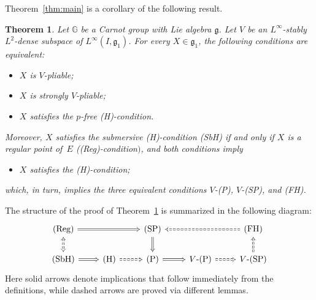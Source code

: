\documentclass[10pt,a4paper]{amsart}
\numberwithin{equation}{section}
\newtheorem{Theorem}{Theorem}[section]
\theoremstyle{definition}
\begin{document}
Theorem~\ref{thm:main} is a corollary of the following result.


\begin{Theorem}\label{thm:strong_main}
 Let $\mathbb{G}$ be a Carnot group with Lie algebra ${\mathfrak g}$. Let $V$ be an
 $L^\infty$-stably $L^2$-dense subspace of $L^\infty(I,{\mathfrak g}_1)$.
 For every $X\in {\mathfrak g}_1$, the following conditions are equivalent:
 \begin{itemize}\itemsep=0pt\setlength{\leftskip}{0.5cm}
 \item[$V$-{\rm (P)}] $X$ is $V$-pliable;
 \item[$V$-{\rm (SP)}] $X$ is strongly $V$-pliable;
 \item[{\rm (FH)}] $X$ satisfies the $p$-free {\rm (H)}-condition.
 \end{itemize}
Moreover, $X$ satisfies the submersive {\rm (H)}-condition {\rm (SbH)} if and only if $X$ is a regular point of~$E$ {\rm ((Reg)}-condition$)$, and both conditions imply
\begin{itemize}\itemsep=0pt\setlength{\leftskip}{0.45cm}
\item[{\rm (H)}] $X$ satisfies the {\rm (H)}-condition;
\end{itemize}
which, in turn, implies the three equivalent conditions $V$-{\rm (P)}, $V$-{\rm (SP)}, and {\rm (FH)}.
\end{Theorem}

The structure of the proof of Theorem~\ref{thm:strong_main} is summarized
 in the following
 diagram:
\[
\begin{tikzcd}
 \text{(Reg)} \arrow[rr,Rightarrow] \arrow[d,dashed,Leftrightarrow]&&\mbox{(SP)}\arrow[d,Rightarrow]
 &&\mbox{(FH)}\arrow[ll,dashed,Rightarrow]
 \\
 \mbox{(SbH)}\arrow[r,Rightarrow]& \mbox{(H)} \arrow[r,dashed,Rightarrow]&\mbox{(P)}\arrow[r,Rightarrow]&V\mbox{-(P)}
 \arrow[r, dashed, Rightarrow]&V\mbox{-(SP)}
 \arrow[u,dashed,Rightarrow]
 \end{tikzcd}
\]
Here solid arrows denote implications that
 follow immediately from
the definitions, while dashed arrows are proved
via different lemmas.
\end{document}
